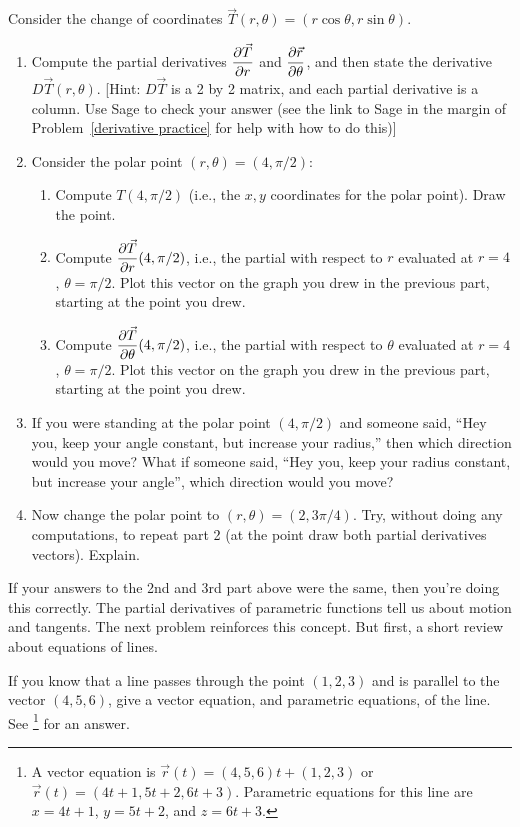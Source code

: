\begin{problem}
 Consider the change of coordinates $\vec T(r,\theta) = (r\cos \theta, r\sin \theta)$.
\begin{enumerate}
 \item{}%
 Compute the partial derivatives $\displaystyle\frac{\partial \vec T}{\partial r}$ and $\displaystyle\frac{\partial \vec r}{\partial \theta}$, and then state the derivative $D\vec T(r,\theta)$. [Hint: $D\vec T$ is a 2 by 2 matrix, and each partial derivative is a column.  Use Sage to check your answer (see the link to Sage in the margin of Problem~\ref{derivative practice} for help with how to do this)]
 \item Consider the polar point $(r,\theta) = (4,\pi/2)$:
   \begin{enumerate}
   \item Compute $T(4,\pi/2)$ (i.e., the $x,y$ coordinates for the polar point).  Draw the point.
   \item Compute $\displaystyle \frac{\partial \vec T}{\partial r}(4,\pi/2)$, i.e., the partial with respect to $r$ evaluated at $r=4$, $\theta=\pi/2$.  Plot this vector on the graph you drew in the previous part, starting at the point you drew.
   \item Compute $\displaystyle \frac{\partial \vec T}{\partial \theta}(4,\pi/2)$, i.e., the partial with respect to $\theta$ evaluated at $r=4$, $\theta=\pi/2$.  Plot this vector on the graph you drew in the previous part, starting at the point you drew.
   \end{enumerate}
 \item If you were standing at the polar point $(4,\pi/2)$ and someone said, ``Hey you, keep your angle constant, but increase your radius,'' then which direction would you move?  What if someone said, ``Hey you, keep your radius constant, but increase your angle'', which direction would you move?
 \item Now change the polar point to $(r,\theta) = (2,3\pi/4)$.  Try, without doing  any computations, to repeat part 2 (at the point draw both partial derivatives vectors). Explain.
\end{enumerate}
\end{problem}

If your answers to the 2nd and 3rd part above were the same, then you're doing this correctly.  The partial derivatives of parametric functions tell us about motion and tangents. The next problem reinforces this concept.  But first, a short review about equations of lines.
\begin{review*}
 If you know that a line passes through the point $(1,2,3)$ and is parallel to the vector $(4,5,6)$, give a vector equation, and parametric equations, of the line. See \footnote{A vector equation is $\vec r(t) = (4,5,6)t+(1,2,3)$ or $\vec r(t) = (4t+1, 5t+2, 6t+3)$.  Parametric equations for this line are 
$x=4t+1$, $y=5t+2$, and $z=6t+3$. 
} for an answer.
\end{review*}




